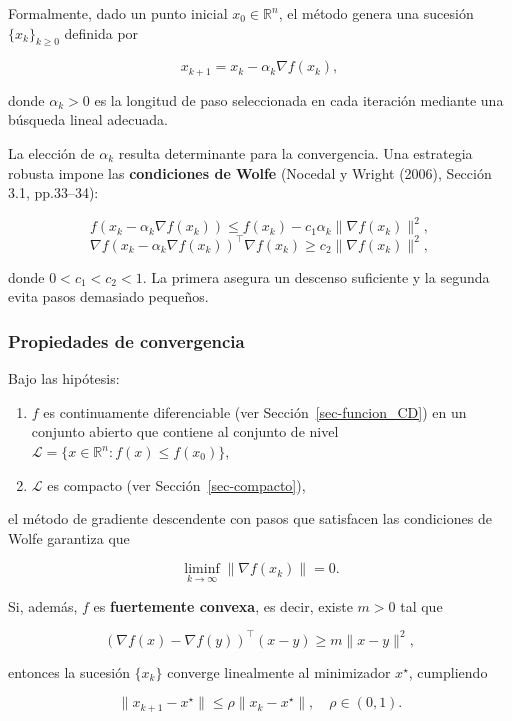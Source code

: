 \documentclass[
  spanish,
  us-letterpaper,
]{scrreprt}
\providecommand{\tightlist}{%
  \setlength{\itemsep}{0pt}\setlength{\parskip}{0pt}}
\numberwithin{equation}{section}
\begin{document}
Formalmente, dado un punto inicial \(x_0 \in \mathbb{R}^n\), el método
genera una sucesión \(\{x_k\}_{k \geq 0}\) definida por

\[
  x_{k+1} = x_k - \alpha_k \nabla f(x_k),
\]

donde \(\alpha_k > 0\) es la longitud de paso seleccionada en cada
iteración mediante una búsqueda lineal adecuada.

La elección de \(\alpha_k\) resulta determinante para la convergencia.
Una estrategia robusta impone las \textbf{condiciones de Wolfe} (Nocedal
y Wright (2006), Sección 3.1, pp.33--34):

\[
  f(x_k - \alpha_k \nabla f(x_k)) \le f(x_k) - c_1 \alpha_k \|\nabla f(x_k)\|^2,
\] \[
  \nabla f(x_k - \alpha_k \nabla f(x_k))^\top \nabla f(x_k) \ge c_2 \|\nabla f(x_k)\|^2,
\]

donde \(0 < c_1 < c_2 < 1\). La primera asegura un descenso suficiente y
la segunda evita pasos demasiado pequeños.

\subsubsection{Propiedades de
convergencia}\label{propiedades-de-convergencia}

Bajo las hipótesis:

\begin{enumerate}
\def\labelenumi{\arabic{enumi}.}
\tightlist
\item
  \(f\) es continuamente diferenciable (ver
  Sección~\ref{sec-funcion_CD}) en un conjunto abierto que contiene al
  conjunto de nivel
  \(\mathcal{L} = \{x \in \mathbb{R}^n : f(x) \le f(x_0)\}\),
\item
  \(\mathcal{L}\) es compacto (ver Sección~\ref{sec-compacto}),
\end{enumerate}

el método de gradiente descendente con pasos que satisfacen las
condiciones de Wolfe garantiza que

\[
  \liminf_{k \to \infty} \|\nabla f(x_k)\| = 0.
\]

Si, además, \(f\) es \textbf{fuertemente convexa}, es decir, existe
\(m > 0\) tal que

\[
  (\nabla f(x) - \nabla f(y))^\top (x - y) \ge m \|x - y\|^2,
\]

entonces la sucesión \(\{x_k\}\) converge linealmente al minimizador
\(x^\star\), cumpliendo

\[
  \|x_{k+1} - x^\star\| \le \rho \|x_k - x^\star\|, \quad \rho \in (0,1).
\]
\end{document}
